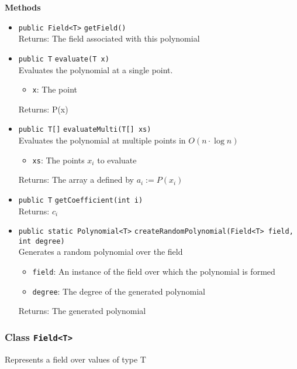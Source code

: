 \textbf{Methods}
\begin{itemize}
\item \lstinline|public Field<T>| \lstinline|getField|\lstinline|()|\\
Returns: The field associated with this polynomial



\item \lstinline|public T| \lstinline|evaluate|\lstinline|(T x)|\\
Evaluates the polynomial at a single point.
\begin{itemize}
\item \lstinline|x|: The point
\end{itemize}

Returns: P(x)

\item \lstinline|public T[]| \lstinline|evaluateMulti|\lstinline|(T[] xs)|\\
Evaluates the polynomial at multiple points in $O\left(n \cdot \log
 n\right)$
\begin{itemize}
\item \lstinline|xs|: The points $x_i$ to evaluate
\end{itemize}

Returns: The array a defined by $a_i := P(x_i)$

\item \lstinline|public T| \lstinline|getCoefficient|\lstinline|(int i)|\\
Returns: $c_i$



\item \lstinline|public static Polynomial<T>| \lstinline|createRandomPolynomial|\lstinline|(Field<T> field, int degree)|\\
Generates a random polynomial over the field
\begin{itemize}
\item \lstinline|field|: An instance of the field over which the polynomial is formed
\item \lstinline|degree|: The degree of the generated polynomial
\end{itemize}

Returns: The generated polynomial

\end{itemize}

\subsubsection{Class \lstinline|Field<T>|}
Represents a field over values of type T \\


